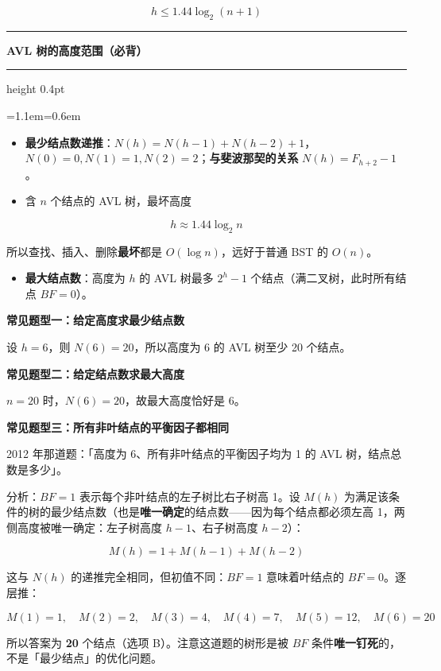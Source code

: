 \documentclass[11pt,openany,UTF8]{ctexbook}
\newcommand{\callouthead}[2]{%
  \par\addvspace{7pt}\noindent
  {\color{#1}\rule[-0.15em]{3pt}{1.05em}}\hspace{0.5em}%
  {\bfseries\color{#1}#2}\par\nobreak\vspace{-0.35em}%
  {\color{rulesep}\hrule height 0.4pt}\nobreak\vspace{0.45em}%
  \begingroup\small\setlength{\parindent}{0pt}%
  \leftskip=1.1em\rightskip=0.6em\noindent\ignorespaces}
\newcommand{\calloutend}{\par\endgroup\addvspace{7pt}}
\newenvironment{callkey}[1]{\callouthead{keybar}{#1}}{\calloutend}
\begin{document}
\[h\le 1.44\log_2(n+1)\]

\begin{callkey}{AVL 树的高度范围（必背）}
\begin{itemize}
\item \textbf{最少结点数递推}：$N(h)=N(h-1)+N(h-2)+1$，$N(0)=0,N(1)=1,N(2)=2$；\textbf{与斐波那契的关系} $N(h)=F_{h+2}-1$。
\item 含 $n$ 个结点的 AVL 树，最坏高度
\end{itemize}
\[h\approx 1.44\log_2 n\]

所以查找、插入、删除\textbf{最坏}都是 $O(\log n)$，远好于普通 BST 的 $O(n)$。

\begin{itemize}
\item \textbf{最大结点数}：高度为 $h$ 的 AVL 树最多 $2^{h}-1$ 个结点（满二叉树，此时所有结点 $BF=0$）。
\end{itemize}
\end{callkey}

\textbf{常见题型一：给定高度求最少结点数}

设 $h=6$，则 $N(6)=20$，所以高度为 6 的 AVL 树至少 20 个结点。

\textbf{常见题型二：给定结点数求最大高度}

$n=20$ 时，$N(6)=20$，故最大高度恰好是 6。

\textbf{常见题型三：所有非叶结点的平衡因子都相同}

2012 年那道题：「高度为 6、所有非叶结点的平衡因子均为 1 的 AVL 树，结点总数是多少」。

分析：$BF=1$ 表示每个非叶结点的左子树比右子树高 1。设 $M(h)$ 为满足该条件的树的最少结点数（也是\textbf{唯一确定}的结点数——因为每个结点都必须左高 1，两侧高度被唯一确定：左子树高度 $h-1$、右子树高度 $h-2$）：

\[M(h)=1+M(h-1)+M(h-2)\]

这与 $N(h)$ 的递推完全相同，但初值不同：$BF=1$ 意味着叶结点的 $BF=0$。逐层推：

\[M(1)=1,\quad M(2)=2,\quad M(3)=4,\quad M(4)=7,\quad M(5)=12,\quad M(6)=20\]

所以答案为 \textbf{20} 个结点（选项 B）。注意这道题的树形是被 $BF$ 条件\textbf{唯一钉死}的，不是「最少结点」的优化问题。
\end{document}
